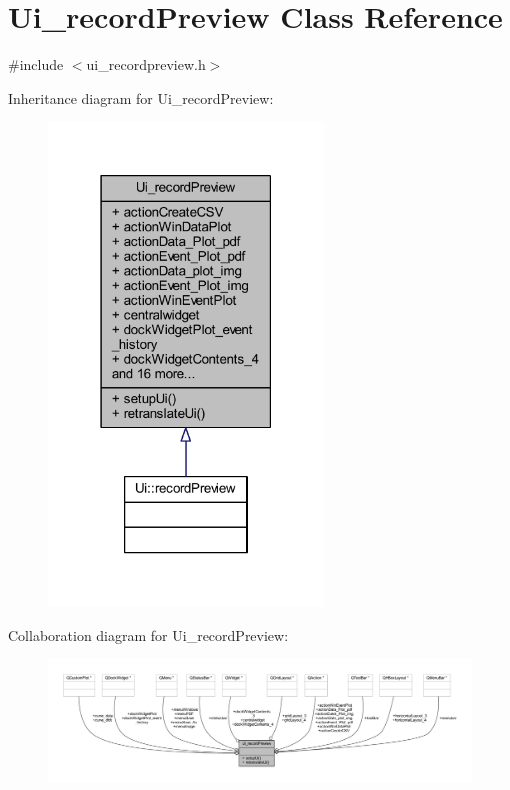 \hypertarget{a00028}{\section{Ui\+\_\+record\+Preview Class Reference}
\label{a00028}
}


{\ttfamily \#include $<$ui\+\_\+recordpreview.\+h$>$}



Inheritance diagram for Ui\+\_\+record\+Preview\+:
\nopagebreak
\begin{figure}[H]
\begin{center}
\leavevmode
\includegraphics[width=207pt]{da/de0/a00317}
\end{center}
\end{figure}


Collaboration diagram for Ui\+\_\+record\+Preview\+:
\nopagebreak
\begin{figure}[H]
\begin{center}
\leavevmode
\includegraphics[width=350pt]{d2/d41/a00318}
\end{center}
\end{figure}
